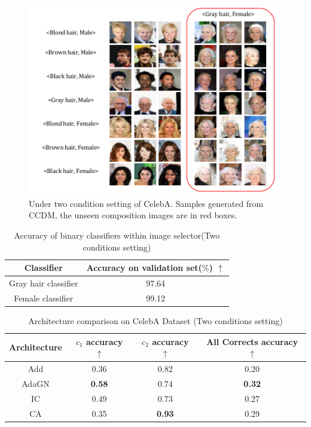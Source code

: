 \begin{figure} [H]
    \centering
    \includegraphics[width=1\linewidth]{figures/CelebA1.pdf}
    \caption{Under two condition setting of CelebA. Samples generated from CCDM, the unseen composition images are in red boxes.}
    \label{fig:sample_9}
\end{figure}

\begin{table} [H]
    \centering
    \begin{tabular}{cc}
         Classifier & Accuracy on validation set($\%$) $\uparrow$ \\
         \hline
         Gray hair classifier & 97.64 \\
         Female classifier & 99.12 \\
         
    \end{tabular}
    \caption{Accuracy of binary classifiers within image selector(Two conditions setting)}
    \label{CelebABinAcc}
\end{table}

\begin{table} [H]
    \centering
    \begin{tabular}{cccc}
         Architecture & $c_1$ accuracy $\uparrow$ & $c_2$ accuracy $\uparrow$ & All Corrects accuracy $\uparrow$ \\
         \hline
         Add  & 0.36 & 0.82 & 0.20\\
         AdaGN & \textbf{0.58} & 0.74 & \textbf{0.32}\\
         IC & 0.49 & 0.73 & 0.27 \\
         CA & 0.35 & \textbf{0.93} & 0.29 \\
    \end{tabular}
    \caption{Architecture comparison on CelebA Dataset (Two conditions setting)}
    \label{tab:CelebAAcc}
\end{table}

